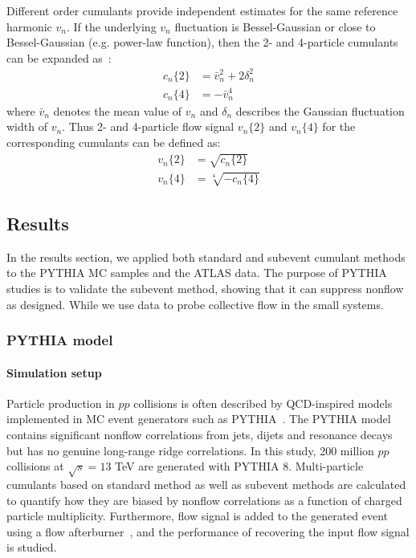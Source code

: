 Different order cumulants provide independent estimates for the same reference harmonic $v_n$. If the underlying $v_n$ fluctuation is Bessel-Gaussian or close to Bessel-Gaussian (e.g. power-law function), then the 2- and 4-particle cumulants can be expanded as~\cite{Voloshin:2007pc}:
\begin{equation}
\begin{split}
c_n\{2\} &= \bar{v}_n^2 + 2\delta_n^2 \\
c_n\{4\} &= -\bar{v}_n^4
\end{split}
\end{equation}
where $\bar{v}_n$ denotes the mean value of $v_n$ and $\delta_n$ describes the Gaussian fluctuation width of $v_n$. Thus 2- and 4-particle flow signal $v_n\{2\}$ and $v_n\{4\}$ for the corresponding cumulants can be defined as:
\begin{equation}
\begin{split}
v_n\{2\} &= \sqrt{c_n\{2\}} \\
v_n\{4\} &= \sqrt[4]{-c_n\{4\}}
\end{split}
\end{equation}



\subsection{Results}

In the results section, we applied both standard and subevent cumulant methods to the PYTHIA MC samples and the ATLAS data. The purpose of PYTHIA studies is to validate the subevent method, showing that it can suppress nonflow as designed. While we use data to probe collective flow in the small systems.



\subsubsection{PYTHIA model}

\paragraph{Simulation setup}

Particle production in $pp$ collisions is often described by QCD-inspired models implemented in MC event generators such as PYTHIA~\cite{Sjostrand:2007gs}. The PYTHIA model contains significant nonflow correlations from jets, dijets and resonance decays but has no genuine long-range ridge correlations. In this study, 200 million $pp$ collisions at $\sqrt{s}=13$ TeV are generated with PYTHIA 8. Multi-particle cumulants based on standard method as well as subevent methods are calculated to quantify how they are biased by nonflow correlations as a function of charged particle multiplicity. Furthermore, flow signal is added to the generated event using a flow afterburner~\cite{Masera:2009zz}, and the performance of recovering the input flow signal is studied.

